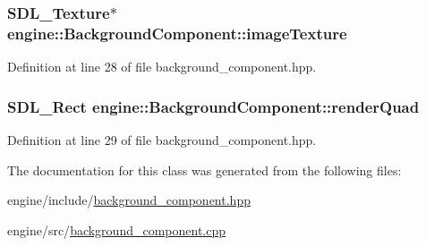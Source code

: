 \subsubsection[{\texorpdfstring{image\+Texture}{imageTexture}}]{\setlength{\rightskip}{0pt plus 5cm}S\+D\+L\+\_\+\+Texture$\ast$ engine\+::\+Background\+Component\+::image\+Texture\hspace{0.3cm}{\ttfamily [protected]}}\hypertarget{classengine_1_1_background_component_a8f3e8087b12106e4cea2f3c3c5e75c8e}{}\label{classengine_1_1_background_component_a8f3e8087b12106e4cea2f3c3c5e75c8e}


Definition at line 28 of file background\+\_\+component.\+hpp.

\subsubsection[{\texorpdfstring{render\+Quad}{renderQuad}}]{\setlength{\rightskip}{0pt plus 5cm}S\+D\+L\+\_\+\+Rect engine\+::\+Background\+Component\+::render\+Quad\hspace{0.3cm}{\ttfamily [protected]}}\hypertarget{classengine_1_1_background_component_afade3c167174d12a54b2b548199c3942}{}\label{classengine_1_1_background_component_afade3c167174d12a54b2b548199c3942}


Definition at line 29 of file background\+\_\+component.\+hpp.



The documentation for this class was generated from the following files\+:\begin{DoxyCompactItemize}
\item 
engine/include/\hyperlink{background__component_8hpp}{background\+\_\+component.\+hpp}\item 
engine/src/\hyperlink{background__component_8cpp}{background\+\_\+component.\+cpp}\end{DoxyCompactItemize}
